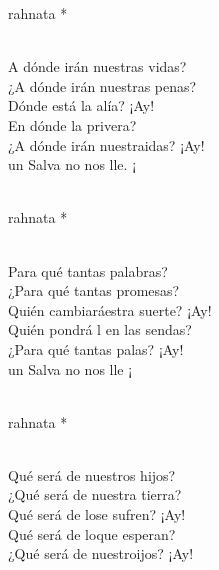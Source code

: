\documentclass[12pt]{article}
\begin{document}
\begin{multicols*}{2}
\begin{cancion}%
	\begin{chorus}%
	rahnata *\\
	\end{chorus}%
	\jump\\
	A dónde irán nuestras vidas?\\
¿A dónde irán nuestras penas?\\
	Dónde está la alía? ¡Ay!\\
	En dónde la privera?\\
	¿A dónde irán nuestraidas? ¡Ay!\\
	 un Salva no nos lle. ¡\\\jump\\
	\begin{chorus}%
	rahnata *\\
	\end{chorus}%
	\jump\\
	Para qué tantas palabras?\\
¿Para qué tantas promesas?\\
	Quién cambiaráestra suerte? ¡Ay! \\
	Quién pondrá l en las sendas?\\
	¿Para qué tantas palas? ¡Ay!\\
	 un Salva no nos lle ¡\\\jump\\
	\begin{chorus}%
	rahnata *\\
	\end{chorus}%
	\jump\\
	Qué será de nuestros hijos?\\
¿Qué será de nuestra tierra?\\
	Qué será de lose sufren? ¡Ay!\\
	Qué será de loque esperan?\\
	¿Qué será de nuestroijos? ¡Ay!\\

\end{cancion}
\end{multicols*}
\end{document}
